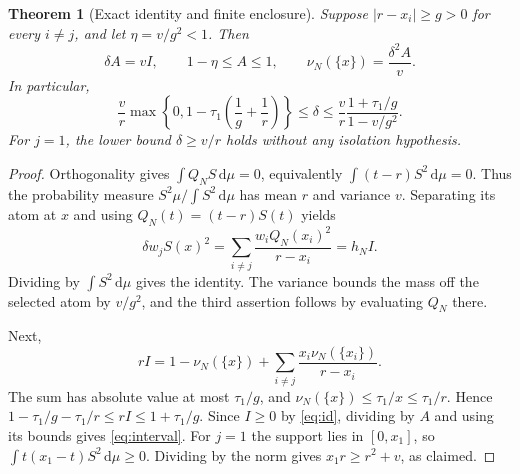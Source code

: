 \documentclass[11pt]{article}
\newtheorem{theorem}{Theorem}[section]
\theoremstyle{remark}\newtheorem{remark}[theorem]{Remark}
\newcommand{\dd}{\,\mathrm d}
\begin{document}
\begin{theorem}[Exact identity and finite enclosure]\label{thm:residual}
Suppose $|r-x_i|\ge g>0$ for every $i\ne j$, and let $\eta=v/g^2<1$. Then
\begin{equation}\label{eq:id}
 \boxed{\delta A=vI,\qquad 1-\eta\le A\le1,\qquad
 \nu_N(\{x\})=\frac{\delta^2 A}{v}.}
\end{equation}
In particular,
\begin{equation}\label{eq:interval}
 \frac vr\max\left\{0,1-\tau_1\left(\frac1g+\frac1r\right)\right\}
 \le \delta\le
 \frac vr\frac{1+\tau_1/g}{1-v/g^2}.
\end{equation}
For $j=1$, the lower bound $\delta\ge v/r$ holds without any isolation hypothesis.
\end{theorem}
\begin{proof}
Orthogonality gives $\int Q_NS\dd\mu=0$, equivalently $\int(t-r)S^2\dd\mu=0$. Thus the probability measure $S^2\mu/\int S^2\dd\mu$ has mean $r$ and variance $v$. Separating its atom at $x$ and using $Q_N(t)=(t-r)S(t)$ yields
\[
 \delta w_j S(x)^2=\sum_{i\ne j}\frac{w_iQ_N(x_i)^2}{r-x_i}=h_N I.
\]
Dividing by $\int S^2\dd\mu$ gives the identity. The variance bounds the mass off the selected atom by $v/g^2$, and the third assertion follows by evaluating $Q_N$ there.

Next,
\[
 rI=1-\nu_N(\{x\})+\sum_{i\ne j}\frac{x_i\nu_N(\{x_i\})}{r-x_i}.
\]
The sum has absolute value at most $\tau_1/g$, and $\nu_N(\{x\})\le\tau_1/x\le\tau_1/r$. Hence $1-\tau_1/g-\tau_1/r\le rI\le1+\tau_1/g$. Since $I\ge0$ by \eqref{eq:id}, dividing by $A$ and using its bounds gives \eqref{eq:interval}. For $j=1$ the support lies in $[0,x_1]$, so $\int t(x_1-t)S^2\dd\mu\ge0$. Dividing by the norm gives $x_1r\ge r^2+v$, as claimed.
\end{proof}
\end{document}
